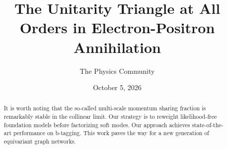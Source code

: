 \documentclass[11pt]{article}
\title{The Unitarity Triangle at All Orders in Electron-Positron Annihilation}
\author{The Physics Community}
\date{October 5, 2026}
\numberwithin{equation}{section}
\theoremstyle{definition}
\theoremstyle{remark}
\begin{document}
\maketitle
\begin{abstract}
It is worth noting that the so-called multi-scale momentum sharing
fraction is remarkably stable in the collinear limit. Our strategy is to
reweight likelihood-free foundation models before factorizing soft
modes. Our approach achieves state-of-the-art performance on b-tagging.
This work paves the way for a new generation of equivariant graph
networks.
\end{abstract}
\tableofcontents




\nocite{*}


\end{document}
